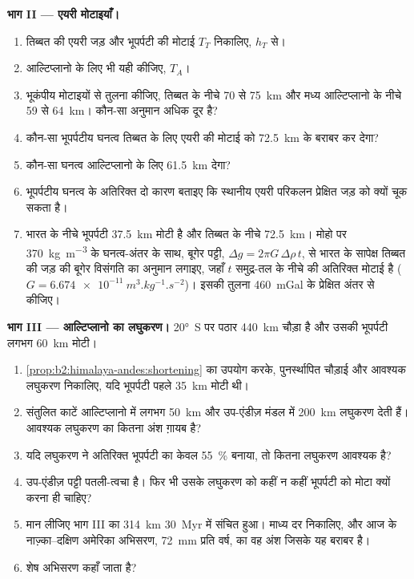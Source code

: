 \begin{problem}[{सप्ताहांत समस्या --- दो पठार}]
\noindent\textbf{भाग II --- एयरी मोटाइयाँ।}
\begin{enumerate}[resume]
\item तिब्बत की एयरी जड़ और भूपर्पटी की मोटाई $T_T$ निकालिए, $h_T$ से।
\item आल्टिप्लानो के लिए भी यही कीजिए, $T_A$।
\item भूकंपीय मोटाइयों से तुलना कीजिए, तिब्बत के नीचे 70 से \qty{75}{km} और मध्य आल्टिप्लानो के नीचे 59 से
\qty{64}{km}। कौन-सा अनुमान अधिक दूर है?
\item कौन-सा भूपर्पटीय घनत्व तिब्बत के लिए एयरी की मोटाई को \qty{72.5}{km} के बराबर कर देगा?
\item कौन-सा घनत्व आल्टिप्लानो के लिए \qty{61.5}{km} देगा?
\item भूपर्पटीय घनत्व के अतिरिक्त दो कारण बताइए कि स्थानीय एयरी परिकलन
प्रेक्षित जड़ को क्यों चूक सकता है।
\item भारत के नीचे भूपर्पटी \qty{37.5}{km} मोटी है और तिब्बत के नीचे \qty{72.5}{km}। मोहो पर
\qty{370}{kg.m^{-3}} के घनत्व-अंतर के साथ, बूगेर पट्टी, $\Delta g
= 2\pi G\,\Delta\rho\,t$, से भारत के सापेक्ष तिब्बत की जड़ की बूगेर विसंगति का अनुमान लगाइए, जहाँ $t$
समुद्र-तल के नीचे की अतिरिक्त मोटाई है ($G = \qty{6.674e-11}{m^3.kg^{-1}.s^{-2}}$)। इसकी तुलना
\qty{460}{mGal} के प्रेक्षित अंतर से कीजिए।
\end{enumerate}

\noindent\textbf{भाग III --- आल्टिप्लानो का लघुकरण।} \ang{20}~S पर पठार
\qty{440}{km} चौड़ा है और उसकी भूपर्पटी लगभग \qty{60}{km} मोटी।
\begin{enumerate}[resume]
\item \cref{prop:b2:himalaya-andes:shortening} का उपयोग करके, पुनर्स्थापित चौड़ाई और
आवश्यक लघुकरण निकालिए, यदि भूपर्पटी पहले \qty{35}{km} मोटी थी।
\item संतुलित काटें आल्टिप्लानो में लगभग \qty{50}{km} और
उप-एंडीज़ मंडल में \qty{200}{km} लघुकरण देती हैं। आवश्यक लघुकरण का कितना अंश ग़ायब है?
\item यदि लघुकरण ने अतिरिक्त भूपर्पटी का केवल \qty{55}{\percent} बनाया, तो कितना लघुकरण
आवश्यक है?
\item उप-एंडीज़ पट्टी पतली-त्वचा है। फिर भी उसके लघुकरण को कहीं न कहीं भूपर्पटी को मोटा क्यों करना
ही चाहिए?
\item मान लीजिए भाग III का \qty{314}{km} \qty{30}{Myr} में संचित हुआ। माध्य
दर निकालिए, और आज के नाज़्का--दक्षिण अमेरिका अभिसरण, \qty{72}{mm} प्रति वर्ष, का वह अंश जिसके
यह बराबर है।
\item शेष अभिसरण कहाँ जाता है?
\end{enumerate}


\end{problem}
